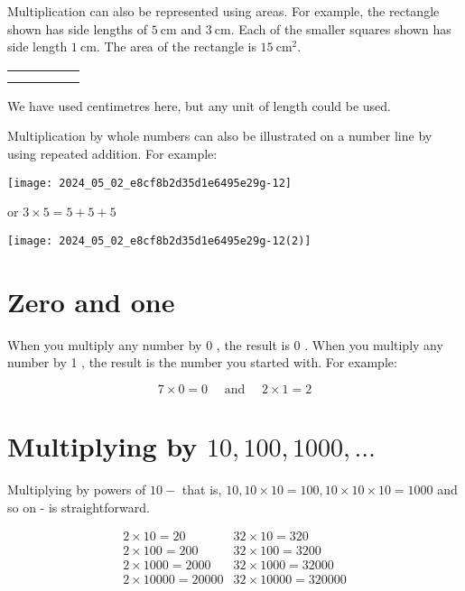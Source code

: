 \documentclass[10pt]{article}
\begin{document}
Multiplication can also be represented using areas. For example, the rectangle shown has side lengths of \(5 \mathrm{~cm}\) and \(3 \mathrm{~cm}\). Each of the smaller squares shown has side length \(1 \mathrm{~cm}\). The area of the rectangle is \(15 \mathrm{~cm}^{2}\).

\begin{center}
\begin{tabular}{|l|l|l|l|l|}
\hline
 &  &  &  &  \\
\hline
 &  &  &  &  \\
\hline
 &  &  &  &  \\
\hline
\end{tabular}
\end{center}

We have used centimetres here, but any unit of length could be used.

Multiplication by whole numbers can also be illustrated on a number line by using repeated addition. For example:

\begin{center}
\texttt{[image: 2024\_05\_02\_e8cf8b2d35d1e6495e29g-12]}
\end{center}

or \(3 \times 5=5+5+5\)

\begin{center}
\texttt{[image: 2024\_05\_02\_e8cf8b2d35d1e6495e29g-12(2)]}
\end{center}

\section*{Zero and one}
When you multiply any number by 0 , the result is 0 . When you multiply any number by 1 , the result is the number you started with. For example:

\[
7 \times 0=0 \quad \text { and } \quad 2 \times 1=2
\]

\section*{Multiplying by \(10,100,1000, \ldots\)}
Multiplying by powers of \(10-\) that is, \(10,10 \times 10=100,10 \times 10 \times 10=1000\) and so on - is straightforward.

\[
\begin{array}{ll}
2 \times 10=20 & 32 \times 10=320 \\
2 \times 100=200 & 32 \times 100=3200 \\
2 \times 1000=2000 & 32 \times 1000=32000 \\
2 \times 10000=20000 & 32 \times 10000=320000
\end{array}
\]
\end{document}
